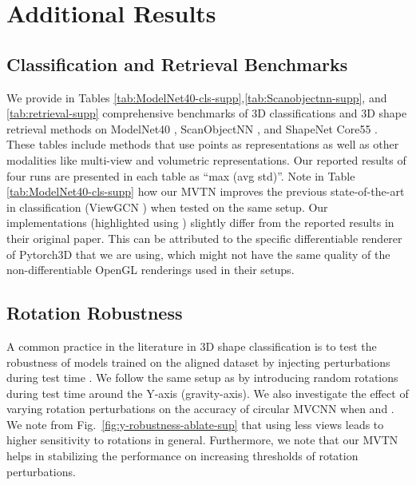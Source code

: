 \documentclass[10pt,twocolumn,letterpaper]{article}
\newcommand{\figLabel}{Fig.~}
\begin{document}
\clearpage \clearpage
\section{Additional Results}

\subsection{Classification and Retrieval Benchmarks}
We provide in Tables \ref{tab:ModelNet40-cls-supp},\ref{tab:Scanobjectnn-supp}, and \ref{tab:retrieval-supp} comprehensive benchmarks of 3D classifications and 3D shape retrieval methods on ModelNet40 \cite{modelnet}, ScanObjectNN \cite{scanobjectnn}, and ShapeNet Core55 \cite{shapenet,shrek17}. These tables include methods that use points as representations as well as other modalities like multi-view and volumetric representations. Our reported results of four runs are presented in each table as ``max (avg  std)''.  Note in Table \ref{tab:ModelNet40-cls-supp} how our MVTN improves the previous state-of-the-art in classification (ViewGCN \cite{mvviewgcn}) when tested on the same setup. Our implementations (highlighted using ) slightly differ from the reported results in their original paper. This can be attributed to the specific differentiable renderer of Pytorch3D \cite{pytorch3d} that we are using, which might not have the same quality of the non-differentiable OpenGL renderings \cite{opengl} used in their setups.       






\subsection{Rotation Robustness}
A common practice in the literature in 3D shape classification is to test the robustness of models trained on the aligned dataset by injecting perturbations during test time \cite{rspointcloud}. We follow the same setup as \cite{rspointcloud} by introducing random rotations during test time around the Y-axis (gravity-axis).
We also investigate the effect of varying rotation perturbations on the accuracy of circular MVCNN when  and . We note from \figLabel{\ref{fig:y-robustness-ablate-sup}} that using less views leads to higher sensitivity to rotations in general. Furthermore, we note that our MVTN helps in stabilizing the performance on increasing thresholds of rotation perturbations.     
\end{document}
